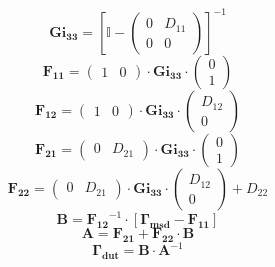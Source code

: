 \[ \mathbf{Gi_{33}} = \left[\mathbb{I} -\left(\begin{smallmatrix} 0 &
D_{11} \\ 0 & 0 \end{smallmatrix}\right)\right]^{-1} \]
\[ \mathbf{F_{11}} = \left(\begin{smallmatrix} 1 & 0
\end{smallmatrix}\right) \cdot\mathbf{Gi_{33}}\cdot
\left(\begin{smallmatrix} 0 \\ 1 \end{smallmatrix}\right) \]
\[ \mathbf{F_{12}} = \left(\begin{smallmatrix} 1 & 0
\end{smallmatrix}\right) \cdot\mathbf{Gi_{33}}\cdot
\left(\begin{smallmatrix} D_{12} \\ 0 \end{smallmatrix}\right) \]
\[ \mathbf{F_{21}} = \left(\begin{smallmatrix} 0 & D_{21}
\end{smallmatrix}\right) \cdot\mathbf{Gi_{33}}\cdot
\left(\begin{smallmatrix} 0 \\ 1 \end{smallmatrix}\right) \]
\[ \mathbf{F_{22}} = \left(\begin{smallmatrix} 0 & D_{21}
\end{smallmatrix}\right) \cdot\mathbf{Gi_{33}}\cdot
\left(\begin{smallmatrix} D_{12} \\ 0 \end{smallmatrix}\right) +
D_{22} \]
\[ \mathbf{B}=\mathbf{F_{12}}^{-1}\cdot\left[ \mathbf{\Gamma_{msd}} -
\mathbf{F_{11}} \right]  \]
\[ \mathbf{A}=\mathbf{F_{21}}+ \mathbf{F_{22}}\cdot\mathbf{B} \]
\[ \mathbf{\Gamma_{dut}} = \mathbf{B} \cdot \mathbf{A}^{-1} \]
